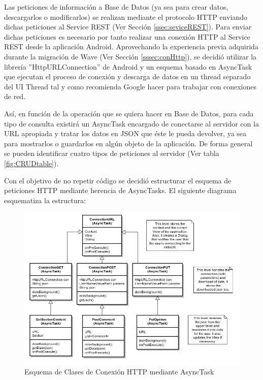 		Las peticiones de información a Base de Datos (ya sea para crear datos, descargarlos o modificarlos) se realizan mediante el protocolo HTTP enviando dichas peticiones al Service REST (Ver Sección \ref{ssec:seviceREST}). Para enviar dichas peticiones es necesario por tanto realizar una conexión HTTP al Service REST desde la aplicación Android. Aprovechando la experiencia previa adquirida durante la migración de Wave (Ver Sección \ref{sssec:conHttp}), se decidió utilizar la librería ''HttpURLConnection'' de Android y un esquema basado en AsyncTask que ejecutan el proceso de conexión y descarga de datos en un thread separado del UI Thread tal y como recomienda Google hacer para trabajar con conexiones de red\cite{ref:android_networking}.
		
		Así, en función de la operación que se quiera hacer en Base de Datos, para cada tipo de consulta existirá un AsyncTask encargado de conectarse al servidor con la URL apropiada y tratar los datos en JSON que éste le pueda devolver, ya sea para mostrarlos o guardarlos en algún objeto de la aplicación. De forma general se pueden identificar cuatro tipos de peticiones al servidor (Ver tabla \ref{fig:CRUDtable}).

Con el objetivo de no repetir código se decidió estructurar el esquema de peticiones HTTP mediante herencia de AsyncTasks. El siguiente diagrama esquematiza la estructura: 

	\begin{figure}[H]
	  \centering
	    \includegraphics[keepaspectratio, scale=0.6]{Media/Diagrams/classDiagramAsyncTask.png}
	  \caption{Esquema de Clases de Conexión HTTP mediante AsyncTask}
	  \label{fig:classConnectionTree}
	\end{figure}	
	
